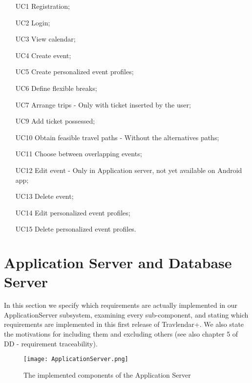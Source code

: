 \begin{itemize}
	\item [UC1] Registration;
	\item [UC2] Login;
	\item [UC3] View calendar;
	\item [UC4] Create event;
	\item [UC5] Create personalized event profiles;
	\item [UC6] Define flexible breaks;
	\item [UC7] Arrange trips - Only with ticket inserted by the user;
	\item [UC9] Add ticket possessed;
	\item [UC10] Obtain feasible travel paths - Without the alternatives paths;
	\item [UC11] Choose between overlapping events;
	\item [UC12] Edit event - Only in Application server, not yet available on Android app; 
	\item [UC13] Delete event;
	\item [UC14] Edit personalized event profiles;
	\item [UC15] Delete personalized event profiles.
\end{itemize}

\section{Application Server and Database Server}
\label{sec:ApplAndDBServers}
In this section we specify which requirements are actually implemented in our ApplicationServer subsystem, examining every sub-component, and stating which requirements are implemented in this first release of Travlendar+. We also state the motivations for including them and excluding others (see also chapter 5 of DD - requirement traceability).
\begin{figure}[H]
	\begin{center}
		\hspace*{-60pt}
		\texttt{[image: ApplicationServer.png]}
	\end{center}
\caption{The implemented components of the Application Server}
\end{figure}

